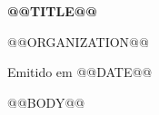 ﻿\documentclass[11pt,a4paper]{article}
\begin{document}
\begin{center}
{\Large\bfseries @@TITLE@@ \par}
\vspace{0.3cm}
{\normalsize @@ORGANIZATION@@ \par}
{\small Emitido em @@DATE@@ \par}
\end{center}
\vspace{0.6cm}

@@BODY@@
\end{document}
